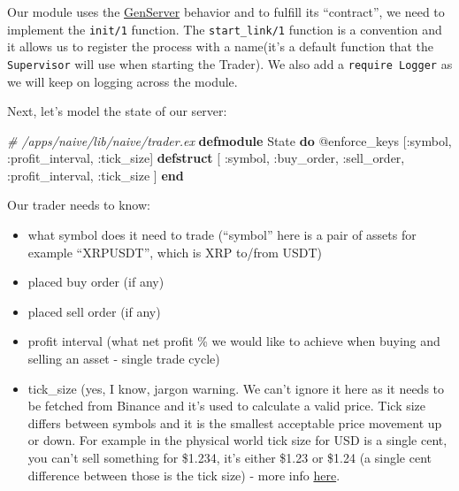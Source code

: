 \documentclass[
  oneside]{book}
\newenvironment{Shaded}{\begin{snugshade}}{\end{snugshade}}
\newcommand{\CommentTok}[1]{\textcolor[rgb]{0.56,0.35,0.01}{\textit{#1}}}
\newcommand{\ConstantTok}[1]{\textcolor[rgb]{0.56,0.35,0.01}{#1}}
\newcommand{\KeywordTok}[1]{\textcolor[rgb]{0.13,0.29,0.53}{\textbf{#1}}}
\newcommand{\NormalTok}[1]{#1}
\newcommand{\OtherTok}[1]{\textcolor[rgb]{0.56,0.35,0.01}{#1}}
\newcommand{\VariableTok}[1]{\textcolor[rgb]{0.00,0.00,0.00}{#1}}
\providecommand{\tightlist}{%
  \setlength{\itemsep}{0pt}\setlength{\parskip}{0pt}}
\begin{document}
Our module uses the \href{https://hexdocs.pm/elixir/master/GenServer.html\#content}{GenServer} behavior and to fulfill its ``contract'', we need to implement the \texttt{init/1} function. The \texttt{start\_link/1} function is a convention and it allows us to register the process with a name(it's a default function that the \texttt{Supervisor} will use when starting the Trader). We also add a \texttt{require\ Logger} as we will keep on logging across the module.

Next, let's model the state of our server:

\begin{Shaded}
\begin{Highlighting}[]
  \CommentTok{\# /apps/naive/lib/naive/trader.ex}
  \KeywordTok{defmodule} \ConstantTok{State} \KeywordTok{do}
    \OtherTok{@enforce\_keys} \OtherTok{[}\VariableTok{:symbol}\NormalTok{, }\VariableTok{:profit\_interval}\NormalTok{, }\VariableTok{:tick\_size}\OtherTok{]}
    \KeywordTok{defstruct} \OtherTok{[}
      \VariableTok{:symbol}\NormalTok{,}
      \VariableTok{:buy\_order}\NormalTok{,}
      \VariableTok{:sell\_order}\NormalTok{,}
      \VariableTok{:profit\_interval}\NormalTok{,}
      \VariableTok{:tick\_size}
    \OtherTok{]}
  \KeywordTok{end}
\end{Highlighting}
\end{Shaded}

Our trader needs to know:

\begin{itemize}
\tightlist
\item
  what symbol does it need to trade (``symbol'' here is a pair of assets for example ``XRPUSDT'', which is XRP to/from USDT)
\item
  placed buy order (if any)
\item
  placed sell order (if any)
\item
  profit interval (what net profit \% we would like to achieve when buying and selling an asset - single trade cycle)
\item
  tick\_size (yes, I know, jargon warning. We can't ignore it here as it needs to be fetched from Binance and it's used to calculate a valid price. Tick size differs between symbols and it is the smallest acceptable price movement up or down. For example in the physical world tick size for USD is a single cent, you can't sell something for \$1.234, it's either \$1.23 or \$1.24 (a single cent difference between those is the tick size) - more info \href{https://www.investopedia.com/terms/t/tick.asp}{here}.
\end{itemize}
\end{document}
